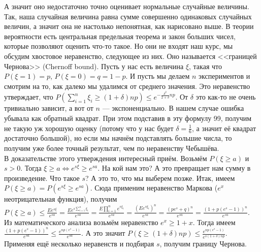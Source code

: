 \documentclass{article}
\begin{document}
\begin{itemize}
\begin{Comment}
            А значит оно недостаточно точно оценивает нормальные случайные величины.\\
            Так, наша случайная величина равна сумме совершенно одинаковых случайных величин, а значит она не настолько непонятная, как нарисовано выше. В теории вероятности есть центральная предельная теорема и закон больших чисел, которые позволяют оценить что-то такое. Но они не входят наш курс, мы обсудим хвостовое неравенство, следующее из них. Оно называется <<границей Чернова>> (Chernoff bound). Пусть у нас есть величина $\xi$, такая что $P(\xi=1)=p$, $P(\xi=0)=q=1-p$. И пусть мы делаем $n$ экспериментов и смотрим на то, как далеко мы удалимся от среднего значения. Это неравенство утверждает, что $P(\sum\limits_{i=1}^n\xi_i\geqslant(1+\delta)np)\leqslant e^{-\frac{\delta^2}{2+\delta}np}$. От $\delta$ это как-то не очень тривиально зависит, а вот от $n$ --- экспоненциально. В нашем случае ошибка убывала как обратный квадрат. При этом подставив в эту формулу 99, получим не такую уж хорошую оценку (потому что у нас будет $\delta=\frac16$, а значит её квадрат достаточно большой), но если мы начнём подставлять большие числа, то получим уже более точный результат, чем по неравенству Чебышёва.\\
            В доказательстве этого утверждения интересный приём. Возьмём $P(\xi\geqslant a)$ и $s>0$. Тогда $\xi\geqslant a\Leftrightarrow e^{s\xi}\geqslant e^{sa}$. На кой нам это? А это превращает нам сумму в произведение. Что такое $s$? А это то, что мы выберем позже. Итак, имеем $P(\xi\geqslant a)=P(e^{s\xi}\geqslant e^{sa})$. Сюда применим неравенство Маркова ($e^{x}$ неотрицательная функция), получим $P(\xi\geqslant a)\leqslant\frac{Ee^{s\xi}}{e^{sa}}=\frac{Ee^{s\sum\limits_{i=1}^n\xi_i}}{e^{sa}}=\frac{E\prod\limits_{i=1}^ne^{s\xi_i}}{e^{sa}}=\frac{(Ee^{s\xi_i})^n}{e^{sa}}=\frac{(pe^s+q)^n}{e^{sa}}=\frac{(1+p(e^s-1))^n}{e^{sa}}$. Из математического анализа возьмём неравенство $e^x\geqslant1+x$. Тогда имеем $\frac{(1+p(e^s-1))^n}{e^{sa}}\leqslant\frac{e^{np(e^s-1)}}{e^{sa}}$. А это значит $P(\xi\geqslant(1+\delta)np)\leqslant\frac{e^{np(e^s-1)}}{e^{s(1+\delta)np}}$. Применяя ещё несколько неравенств и подбирая $s$, получим границу Чернова.
        \end{Comment}
    \end{itemize}
\end{document}
